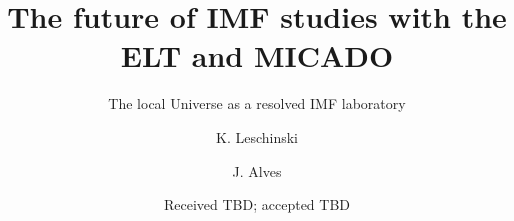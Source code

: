 \documentclass{aa}
\begin{document}
 

  \title{The future of IMF studies with the ELT and MICADO}
  \subtitle{The local Universe as a resolved IMF laboratory}
  \author{K. Leschinski
     \and
          J. Alves
     }


  \date{Received TBD; accepted TBD}

      

  \keywords{}

\maketitle





%








\end{document}
